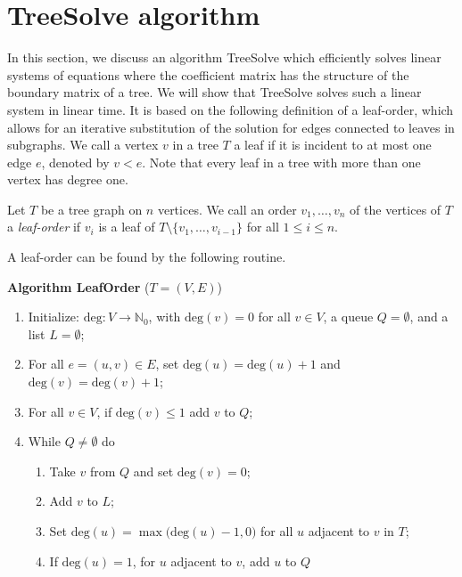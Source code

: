 \documentclass[english,a4paper,nolineno,cleveref]{socg-lipics-v2021}
\begin{document}
\section{TreeSolve algorithm} \label{app:tree_solve}

In this section, we discuss an algorithm {\sc TreeSolve} which efficiently solves linear systems of equations where the coefficient matrix has the structure of the boundary matrix of a tree. We will show that {\sc TreeSolve} solves such a linear system in linear time. It is based on the following definition of a leaf-order, which allows for an iterative substitution of the solution for edges connected to leaves in subgraphs. We call a vertex $v$ in a tree $T$ a leaf if it is incident to at most one edge $e$, denoted by $v<e$. Note that every leaf in a tree with more than one vertex has degree one.

\begin{definition} \label{def:leaf_order}
Let $T$ be a tree graph on $n$ vertices. We call an order $v_1,\ldots,v_n$ of the vertices of $T$ a \emph{leaf-order} if $v_i$ is a leaf of $T\setminus\{v_1,\ldots,v_{i\minus 1}\}$ for all $1\leq i\leq n$.  
\end{definition}


A leaf-order can be found by the following routine. 

\vspace{0.1in}
\noindent
{\bf Algorithm {\sc LeafOrder}} ($T=(V,E)$)
\begin{enumerate}
    \item Initialize: $\text{deg}\colon V\rightarrow \mathbb{N}_0$, with $\text{deg}(v)=0$ for all $v\in V$, a queue $Q=\emptyset$, and a list $L=\emptyset$;
    \item For all $e=(u,v)\in E$, set $\text{deg}(u)=\text{deg}(u)+1$ and $\text{deg}(v)=\text{deg}(v)+1$;
    \item For all $v\in V$, if $\text{deg}(v)\leq 1$ add $v$ to $Q$;
    \item While $Q\neq\emptyset$ do 
    \begin{enumerate}
        \item Take $v$ from $Q$ and set $\text{deg}(v)=0$;
        \item Add $v$ to $L$;
        \item Set $\text{deg}(u)=\max\big(\text{deg}(u)-1,0\big)$ for all $u$ adjacent to $v$ in $T$;
        \item If $\text{deg}(u)=1$, for $u$ adjacent to $v$, add $u$ to $Q$
    \end{enumerate}
\end{enumerate}
\end{document}
